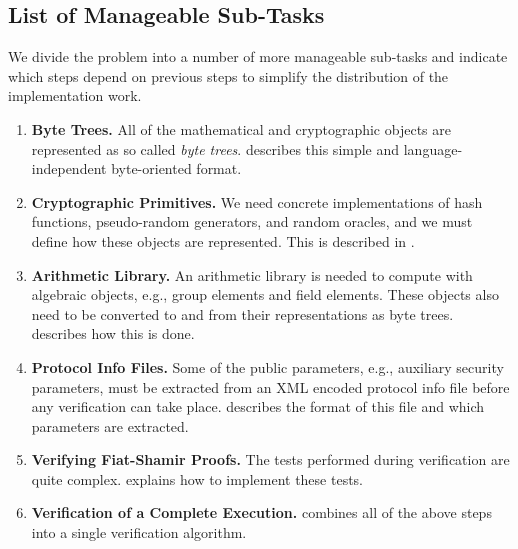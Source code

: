\documentclass[11pt]{article}
\begin{document}
\subsection{List of Manageable Sub-Tasks}

We divide the problem into a number of more manageable sub-tasks and
indicate which steps depend on previous steps to simplify the
distribution of the implementation work.

\begin{enumerate}

\item\label{step:bytetree}\textbf{Byte Trees.} All of the mathematical
  and cryptographic objects are represented as so called \emph{byte
    trees}.  describes this simple and
  language-independent byte-oriented format.

\item\label{step:primitives}\textbf{Cryptographic Primitives.} We need
  concrete implementations of hash functions, pseudo-random generators,
  and random oracles, and we must define how these objects are
  represented. This is described in .

\item\label{step:arithmetic}\textbf{Arithmetic Library.} An arithmetic
  library is needed to compute with algebraic objects, e.g., group
  elements and field elements. These objects also need to be converted
  to and from their representations as byte trees. 
  describes how this is done.

\item\label{step:infofile}\textbf{Protocol Info Files.}  Some of
  the public parameters, e.g., auxiliary security parameters, must be
  extracted from an XML encoded protocol info file before any
  verification can take place.  describes the format
  of this file and which parameters are extracted.

\item\label{step:basicverify}\textbf{Verifying Fiat-Shamir Proofs.}
  The tests performed during verification are quite
  complex.  explains how to implement these tests.

\item\label{step:verify}\textbf{Verification of a Complete Execution.}
   combines all of the above steps into a single
  verification algorithm.

\end{enumerate}
\end{document}
